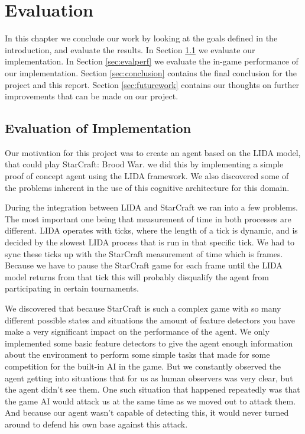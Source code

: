 
\chapter{Evaluation}
In this chapter we conclude our work by looking at the goals defined in the introduction, and evaluate the results.
In Section \ref{sec:evalimp} we evaluate our implementation.
In Section \ref{sec:evalperf} we evaluate the in-game performance of our implementation.
Section \ref{sec:conclusion} contains the final conclusion for the project and this report.
Section \ref{sec:futurework} contains our thoughts on further improvements that can be made on our project.

\section{Evaluation of Implementation}
\label{sec:evalimp}
Our motivation for this project was to create an agent based on the LIDA model, that could play StarCraft: Brood War. we did this by implementing a simple proof of concept agent using the LIDA framework. We also discovered some of the problems inherent in the use of this cognitive architecture for this domain.

During the integration between LIDA and StarCraft we ran into a few problems. The most important one being that measurement of time in both processes are different. LIDA operates with ticks, where the length of a tick is dynamic, and is decided by the slowest LIDA process that is run in that specific tick. We had to sync these ticks up with the StarCraft measurement  of time which is frames. Because we have to pause the StarCraft game for each frame until the LIDA model returns from that tick this will probably disqualify the agent from participating in certain tournaments.

We discovered that because StarCraft is such a complex game with so many different possible states and situations the amount of feature detectors you have make a very significant impact on the performance of the agent. We only implemented some basic feature detectors to give the agent enough information about the environment to perform some simple tasks that made for some competition for the built-in AI in the game. But we constantly observed the agent getting into situations that for us as human observers was very clear, but the agent didn't see them. One such situation that happened repeatedly was that the game AI would attack us at the same time as we moved out to attack them. And because our agent wasn't capable of detecting this, it would never turned around to defend his own base against this attack.

